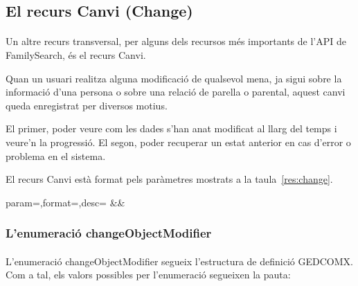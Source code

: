\subsection{El recurs Canvi (Change)}

    \paragraph{}
    Un altre recurs transversal, per alguns dels recursos més importants de l'API de FamilySearch, és el recurs Canvi.

    Quan un usuari realitza alguna modificació de qualsevol mena, ja sigui sobre la informació d'una persona o sobre una relació de parella o parental, aquest canvi queda enregistrat per diversos motius.

    El primer, poder veure com les dades s'han anat modificat al llarg del temps i veure'n la progressió. El segon, poder recuperar un estat anterior en cas d'error o problema en el sistema.

    El recurs Canvi està format pels paràmetres mostrats a la taula~\ref{res:change}.

    \begin{center}
             {param=\param,format=\format,desc=\desc}
             {\param&\format&\desc}
     \end{center}


     \subsubsection{L'enumeració changeObjectModifier}

     \paragraph{}
     L'enumeració changeObjectModifier segueix l'estructura de definició GEDCOMX. Com a tal, els valors possibles per l'enumeració segueixen la pauta:

